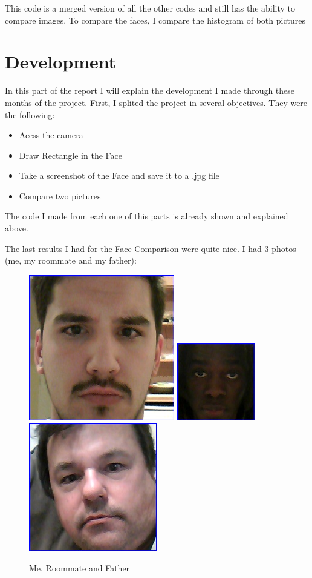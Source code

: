 \documentclass[12pt]{article}
\begin{document}
This code is a merged version of all the other codes and still has the ability to compare images. To compare the faces, I compare the histogram of both pictures

\section{Development}
In this part of the report I will explain the development I made through these months of the project. First, I splited the project in several objectives. They were the following:
\begin{itemize}
	\item Acess the camera
	\item Draw Rectangle in the Face
	\item Take a screenshot of the Face and save it to a .jpg file
	\item Compare two pictures
\end{itemize}
The code I made from each one of this parts is already shown and explained above.

The last results I had for the Face Comparison were quite nice. I had 3 photos (me, my roommate and my father):
\begin{figure}[htp]

\centering
\includegraphics[width=.3\textwidth]{img/rui.jpg}\hfill
\includegraphics[width=.3\textwidth]{img/vadson.jpg}\hfill
\includegraphics[width=.3\textwidth]{img/pedro.jpg}

\caption{Me, Roommate and Father}
\label{fig:figure3}

\end{figure}
\end{document}
